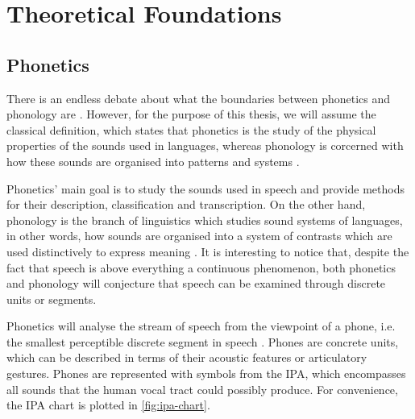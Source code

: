 \chapter{Theoretical Foundations}\label{ch:foundations}

\section{Phonetics}\label{sec:phonetics}

There is an endless debate about what the boundaries between phonetics and phonology are \cite{Steriade2000}. However, for the purpose of this thesis, we will assume the classical definition, which states that phonetics is the study of the physical properties of the sounds used in languages, whereas phonology is corcerned with how these sounds are organised into patterns and systems \cite{Davenport2010}.

Phonetics' main goal is to study the sounds used in speech and provide methods for their description, classification and transcription. On the other hand, phonology is the branch of linguistics which studies sound systems of languages, in other words, how sounds are organised into a system of contrasts which are used distinctively to express meaning \cite{Crystal2011}. It is interesting to notice that, despite the fact that speech is above everything a continuous phenomenon, both phonetics and phonology will conjecture that speech can be examined through discrete units or segments.

Phonetics will analyse the stream of speech from the viewpoint of a phone, i.e. the smallest perceptible discrete segment in speech \cite{Crystal2011}. Phones are concrete units, which can be described in terms of their acoustic features or articulatory gestures. Phones are represented with symbols from the \ac{IPA}, which encompasses all sounds that the human vocal tract could possibly produce. For convenience, the \ac{IPA} chart is plotted in \autoref{fig:ipa-chart}.

